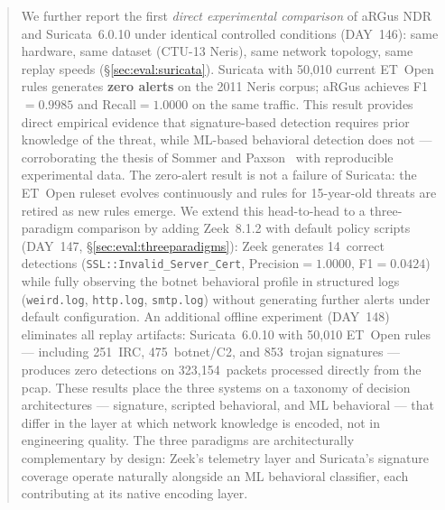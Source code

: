 \documentclass[11pt,a4paper]{article}
\begin{document}
\begin{abstract}
        We further report the first \emph{direct experimental comparison} of aRGus NDR and
        Suricata~6.0.10 under identical controlled conditions (DAY~146): same hardware, same
        dataset (CTU-13 Neris), same network topology, same replay speeds
        (\S\ref{sec:eval:suricata}). Suricata with 50,010 current ET~Open rules generates
        \textbf{zero alerts} on the 2011 Neris corpus; aRGus achieves F1$=0.9985$ and
        Recall$=1.0000$ on the same traffic. This result provides direct empirical evidence that
        signature-based detection requires prior knowledge of the threat, while ML-based
        behavioral detection does not --- corroborating the thesis of Sommer and
        Paxson~\cite{sommer2010} with reproducible experimental data. The zero-alert result is
        not a failure of Suricata: the ET~Open ruleset evolves continuously and rules for
        15-year-old threats are retired as new rules emerge.
        We extend this head-to-head to a three-paradigm comparison by adding
        Zeek~8.1.2 with default policy scripts (DAY~147,
        \S\ref{sec:eval:threeparadigms}): Zeek generates 14~correct detections
        (\texttt{SSL::Invalid\_Server\_Cert}, Precision$=1.0000$, F1$=0.0424$)
        while fully observing the botnet behavioral profile in structured logs
        (\texttt{weird.log}, \texttt{http.log}, \texttt{smtp.log}) without
        generating further alerts under default configuration.
        An additional offline experiment (DAY~148) eliminates all replay artifacts:
        Suricata~6.0.10 with 50,010 ET~Open rules --- including 251~IRC,
        475~botnet/C2, and 853~trojan signatures --- produces zero detections on
        323,154~packets processed directly from the pcap.
        These results place the three systems on a taxonomy of decision architectures
        --- signature, scripted behavioral, and ML behavioral --- that differ in the
        layer at which network knowledge is encoded, not in engineering quality.
        The three paradigms are architecturally complementary by design: Zeek's telemetry layer and
        Suricata's signature coverage operate naturally alongside an ML behavioral
        classifier, each contributing at its native encoding layer.


\end{abstract}
\end{document}

